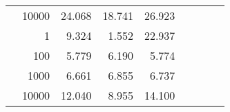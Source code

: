 \begin{table}
\begin{tabular}{rrrrrrrrr}
	            
					 &  
					 
					\multirow{ 1 }{*}{ 10000 } &
					
						
							    
							    
	                           24.068 & 18.741 & 26.923  \\
	                
	            
	        
				\noalign{\smallskip}\hline
				\multirow{ 4 }{*}{ 2000000 } &
				
					
					 
					\multirow{ 1 }{*}{ 1 } &
					
						
							    
							    
	                           9.324 & 1.552 & 22.937  \\
	                
	            
					 &  
					 
					\multirow{ 1 }{*}{ 100 } &
					
						
							    
							    
	                           5.779 & 6.190 & 5.774  \\
	                
	            
					 &  
					 
					\multirow{ 1 }{*}{ 1000 } &
					
						
							    
							    
	                           6.661 & 6.855 & 6.737  \\
	                
	            
					 &  
					 
					\multirow{ 1 }{*}{ 10000 } &
					
						
							    
							    
	                           12.040 & 8.955 & 14.100  \\
	                
	            
	        

\hline

\end{tabular}
\end{table}
\clearpage


	    

